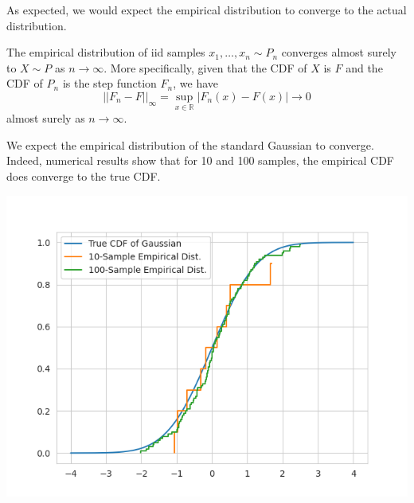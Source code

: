 As expected, we would expect the empirical distribution to converge to the actual distribution. 

\begin{theorem}
  The empirical distribution of iid samples $x_1, \ldots, x_n \sim P_n$ converges almost surely to $X \sim P$ as $n \rightarrow \infty$. More specifically, given that the CDF of $X$ is $F$ and the CDF of $P_n$ is the step function $F_n$, we have 
  \begin{equation}
    ||F_n - F||_{\infty} = \sup_{x \in \mathbb{R}} |F_n (x) - F(x)| \rightarrow 0
  \end{equation}
  almost surely as $n \rightarrow \infty$. 
\end{theorem}

\begin{example}
  We expect the empirical distribution of the standard Gaussian to converge. Indeed, numerical results show that for 10 and 100 samples, the empirical CDF does converge to the true CDF. 

  \begin{center}
    \includegraphics[scale=0.4]{img/empirical_distribution.png}
  \end{center}
\end{example}



